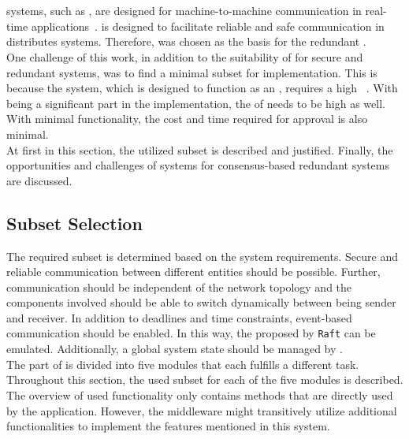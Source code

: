 \section{}

 systems, such as , are designed for machine-to-machine communication in real-time applications~\cite{omgDDSspec}.
 is designed to facilitate reliable and safe communication in distributes systems.
Therefore,  was chosen as the basis for the redundant .
\\

One challenge of this work, in addition to the suitability of  for secure and redundant systems, was to find a minimal subset for implementation.
This is because the system, which is designed to function as an , requires a high ~\cite{ChakrabortyFaultTolerantRailway}.
With  being a significant part in the implementation, the  of  needs to be high as well.
With minimal functionality, the cost and time required for approval is also minimal.
\\

At first in this section, the utilized  subset is described and justified.
Finally, the opportunities and challenges of  systems for consensus-based redundant systems are discussed.

\subsection{Subset Selection}

The required subset is determined based on the system requirements.
Secure and reliable communication between different entities should be possible.
Further, communication should be independent of the network topology and the components involved should be able to switch dynamically between being sender and receiver.
In addition to deadlines and time constraints, event-based communication should be enabled.
In this way, the  proposed by \texttt{Raft} can be emulated.
Additionally, a global system state should be managed by .
\\

The  part of  is divided into five modules that each fulfills a different task.
Throughout this section, the used subset for each of the five modules is described.
\\

The overview of used functionality only contains methods that are directly used by the application.
However, the middleware might transitively utilize additional functionalities to implement the features mentioned in this system.

